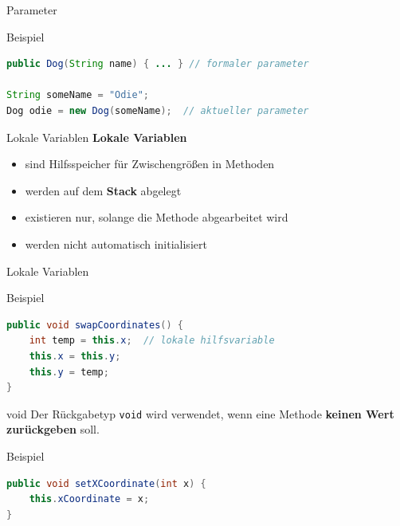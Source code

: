 \documentclass[18pt]{beamer}
\begin{document}
\begin{frame}[fragile]{Parameter}
    \begin{exampleblock}{Beispiel}
        \begin{lstlisting}[language=Java]
public Dog(String name) { ... } // formaler parameter

String someName = "Odie";
Dog odie = new Dog(someName);  // aktueller parameter
        \end{lstlisting}
    \end{exampleblock}
\end{frame}


\begin{frame}{Lokale Variablen}
    \textbf{Lokale Variablen}
    \begin{itemize}
        \item sind Hilfsspeicher für Zwischengrößen in Methoden
        \item werden auf dem \textbf{Stack} abgelegt
        \item existieren nur, solange die Methode abgearbeitet wird
        \item \alert{werden nicht automatisch initialisiert}
    \end{itemize}
\end{frame}

\begin{frame}[fragile]{Lokale Variablen}
    \begin{exampleblock}{Beispiel}
        \begin{lstlisting}[language=Java]
public void swapCoordinates() {
    int temp = this.x;  // lokale hilfsvariable
    this.x = this.y;
    this.y = temp;
}
        \end{lstlisting}
    \end{exampleblock}

\end{frame}

\begin{frame}[fragile]{void}
    Der Rückgabetyp \texttt{void} wird verwendet, wenn eine Methode \textbf{keinen Wert zurückgeben} soll.

    \begin{exampleblock}{Beispiel}
        \begin{lstlisting}[language=Java]
public void setXCoordinate(int x) {
    this.xCoordinate = x;
}
        \end{lstlisting}
    \end{exampleblock}

\end{frame}
\end{document}
